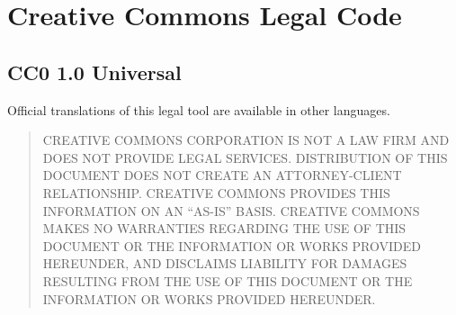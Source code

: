 \section{Creative Commons Legal Code}

\subsection{CC0 1.0 Universal}







Official translations of this legal tool are available in other languages.


\begin{quotation}
CREATIVE COMMONS CORPORATION IS NOT A LAW FIRM AND DOES NOT
PROVIDE LEGAL SERVICES. DISTRIBUTION OF THIS DOCUMENT DOES
NOT CREATE AN ATTORNEY-CLIENT RELATIONSHIP. CREATIVE COMMONS
PROVIDES THIS INFORMATION ON AN ``AS-IS'' BASIS. CREATIVE
COMMONS MAKES NO WARRANTIES REGARDING THE USE OF THIS
DOCUMENT OR THE INFORMATION OR WORKS PROVIDED HEREUNDER, AND
DISCLAIMS LIABILITY FOR DAMAGES RESULTING FROM THE USE OF
THIS DOCUMENT OR THE INFORMATION OR WORKS PROVIDED
HEREUNDER.
\end{quotation}
